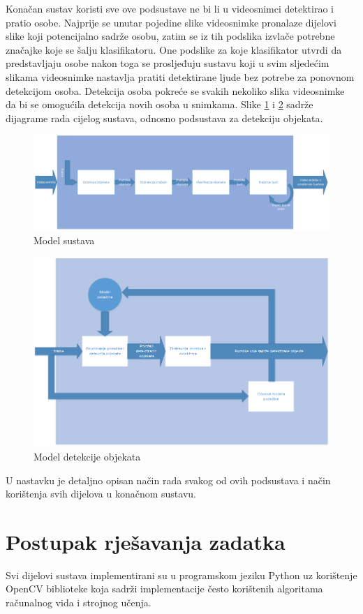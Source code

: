 \documentclass[utf8, seminar, numeric, times]{fer}
\begin{document}
Konačan sustav koristi sve ove podsustave ne bi li u videosnimci detektirao i pratio osobe. Najprije se unutar pojedine slike videosnimke  pronalaze dijelovi slike koji potencijalno sadrže osobu, zatim se iz tih podslika izvlače potrebne značajke koje se šalju klasifikatoru. One podslike za koje klasifikator utvrdi da predstavljaju osobe nakon toga se prosljeđuju sustavu koji u svim sljedećim slikama videosnimke nastavlja pratiti detektirane ljude bez potrebe za ponovnom detekcijom osoba. Detekcija osoba pokreće se svakih nekoliko slika videosnimke da bi se omogućila detekcija novih osoba u snimkama. Slike \ref{sustav} i \ref{pozadina} sadrže dijagrame rada cijelog sustava, odnosno podsustava za detekciju objekata.
\begin{figure}
\centering
\includegraphics[width=1.1\textwidth]{sustav.png}
\caption{Model sustava}
\label{sustav}
\end{figure}
\begin{figure}
\centering
\includegraphics[width=1\textwidth]{pozadina.png}
\caption{Model detekcije objekata}
\label{pozadina}
\end{figure}
U nastavku je detaljno opisan način rada svakog od ovih podsustava i način korištenja svih dijelova u konačnom sustavu.
\chapter{Postupak rješavanja zadatka}
Svi dijelovi sustava implementirani su u programskom jeziku Python uz korištenje OpenCV biblioteke koja sadrži implementacije često korištenih algoritama računalnog vida i strojnog učenja.
\end{document}

